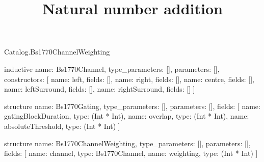 \begin{lexlean}{Catalog.Bs1770ChannelWeighting}
\title{Natural number addition}
\begin{semanticmodule}
inductive{
  name: Bs1770Channel,
  type_parameters: [],
  parameters: [],
  constructors: [
    {name: left, fields: []},
    {name: right, fields: []},
    {name: centre, fields: []},
    {name: leftSurround, fields: []},
    {name: rightSurround, fields: []}
  ]
}

structure{
  name: Bs1770Gating,
  type_parameters: [],
  parameters: [],
  fields: [
    {name: gatingBlockDuration, type: (Int * Int)},
    {name: overlap, type: (Int * Int)},
    {name: absoluteThreshold, type: (Int * Int)}
  ]
}

structure{
  name: Bs1770ChannelWeighting,
  type_parameters: [],
  parameters: [],
  fields: [
    {name: channel, type: Bs1770Channel},
    {name: weighting, type: (Int * Int)}
  ]
}
\end{semanticmodule}
\end{lexlean}
